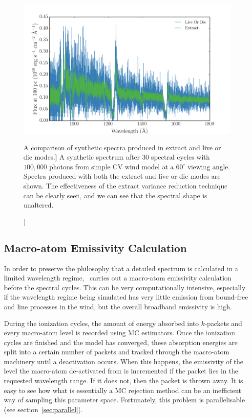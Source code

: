 \begin{figure}
\centering
\includegraphics[width=1.0\textwidth]{figures/03-radtrans/extract_demo.png}
\caption
[A comparison of synthetic spectra produced in extract and live or die modes.]
{
A synthetic spectrum after $30$ spectral cycles with $100,000$ photons
from simple CV wind model at a $60^\circ$ viewing angle.
Spectra produced with both the extract and live or die modes
are shown. The effectiveness of the extract variance reduction technique can
be clearly seen, and we can see that the spectral shape is unaltered.
} 
\label{fig:extract_demo}
\end{figure}

\subsection{Macro-atom Emissivity Calculation}

In order to preserve the philosophy that a detailed 
spectrum is calculated in a limited wavelength regime, \py\ carries
out a macro-atom emissivity calculation before the spectral cycles.
This can be very computationally intensive, especially if the wavelength regime
being simulated has very little emission from bound-free and line processes
in the wind, but the overall broadband emissivity is high.

During the ionization cycles, the amount of energy absorbed into $k$-packets and 
every macro-atom level is recorded using MC estimators. Once 
the ionization cycles are finished and the model has converged, these absorption
energies are split into a certain number of packets and tracked through
the macro-atom machinery until a deactivation occurs. When this happens,
the emissivity of the level the macro-atom de-activated from is incremented
if the packet lies in the requested wavelength range. If it does not, then 
the packet is thrown away. It is easy to see how what is essentially a MC rejection
method can be an inefficient way of sampling this parameter space. Fortunately,
this problem is parallelisable (see section~\ref{sec:parallel}).

